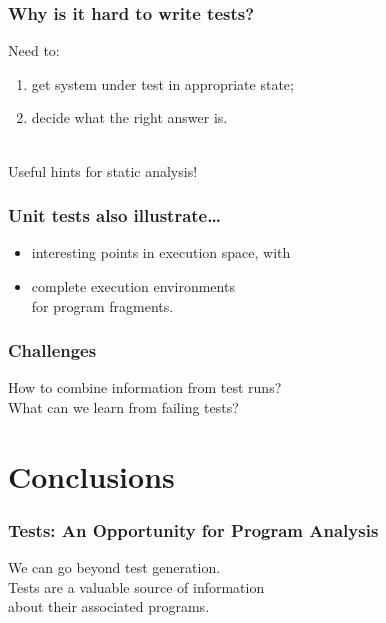 \documentclass{beamer}
\newenvironment{changemargin}[1]{%
  \begin{list}{}{%
    \setlength{\topsep}{0pt}%
    \setlength{\leftmargin}{#1}%
    \setlength{\rightmargin}{1em}
    \setlength{\listparindent}{\parindent}%
    \setlength{\itemindent}{\parindent}%
    \setlength{\parsep}{\parskip}%
  }%
  \item[]}{\end{list}}
\begin{document}
\begin{frame}
  \frametitle{Why is it hard to write tests?}

\begin{changemargin}{1cm}
\Large

Need to:
\begin{enumerate}
\item get system under test in appropriate state;
\item decide what the right answer is.
\end{enumerate}
~\\

Useful hints for static analysis!
\end{changemargin}
\end{frame}

\begin{frame}
  \frametitle{Unit tests also illustrate\ldots}

\begin{changemargin}{1cm}
\Large
\begin{itemize}
\item interesting points in execution space, with
\item complete execution environments \\ \hspace*{2em} for program fragments.
\end{itemize}
\end{changemargin}
\end{frame}

\begin{frame}
  \frametitle{Challenges}

\begin{changemargin}{1cm}
\Large
How to combine information from test runs? \\[1em]
What can we learn from failing tests?
\end{changemargin}
\end{frame}

\section{Conclusions}


\begin{frame}
  \frametitle{Tests: An Opportunity for Program Analysis}
\begin{center}
\Large
We can go beyond test generation.\\[1em]
Tests are a valuable source of information\\ about their associated programs.
\end{center}
\end{frame}
\end{document}
